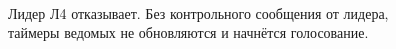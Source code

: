 \documentclass[subf, href, colorlinks=true, 14pt,
times, mtpro, specialist]{disser}
\theoremstyle{definition}
\begin{document}
\begin{figure}[H]
\begin{minipage}[h]{0.46\linewidth}
 \\
\begin{small}
Лидер Л4 отказывает. Без контрольного сообщения от лидера, таймеры ведомых не обновляются и начнётся голосование.
\end{small}
\end{minipage}
\vfill
\begin{minipage}[h]{0.46\linewidth}

\end{minipage}
\end{figure}
\end{document}
